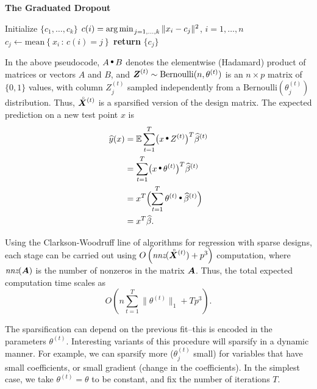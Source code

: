 \documentclass[12pt]{imsart}
\numberwithin{equation}{section}
\theoremstyle{plain}
\theoremstyle{remark}
\def\mbf#1{\mbox{\boldmath$#1$}}
\def\E{{\mathbb E}}
\def\argmin{\mathop{\text{\rm arg\,min}}}
\let\hat\widehat
\let\hat\widehat
\let\hat\widehat
\def\E{{\mathbb E}}
\def\argmin{\mathop{\text{arg\,min}\kern.2ex}}
\let\hat\widehat
\def\betas#1{\widehat\beta^{(#1)}}
\def\thetas#1{\theta^{(#1)}}
\def\Zs#1{\mbf{Z}^{(#1)}}
\def\Xs#1{\accentset{\;\circ}{\mbf{X}}^{(#1)}}
\def\hadamard{\mathop{\raise.5ex\hbox{$\scriptstyle\bullet$}}}
\begin{document}
\begin{frontmatter}
{\bf The Graduated Dropout}
\end{frontmatter}

\begin{center}
\begin{minipage}{.75\columnwidth}
\begin{algorithmic}[1]
   \State Initialize $\{c_1,\ldots, c_k\}$
      \State $c(i) = \argmin_{j=1,\ldots,k} \|x_i - c_j\|^2$, $i=1,\ldots, n$
      \State $c_j \gets \text{mean}\left\{x_i \,:\, c(i) = j\right\}$
   \EndWhile
   \State \textbf{return} $\{c_j\}$
\EndProcedure
\end{algorithmic}
\end{minipage}
\end{center}

In the above pseudocode, $A\hadamard B$ denotes the elementwise
(Hadamard) product of matrices or vectors $A$ and $B$, and $\Zs{t} \sim \text{Bernoulli}(n, \thetas{t})$
is an $n\times p$ matrix of $\{0,1\}$ values, with column $Z_j^{(t)}$ sampled
independently from a $\text{Bernoulli}(\thetas{t}_j)$ distribution.
Thus, $\Xs{t}$ is a sparsified version of the design matrix.
The expected prediction on a new test point $x$ is
\begin{align}
\hat y(x) & = \E \sum_{t=1}^T \bigl(x\hadamard Z^{(t)}\bigr)^T \betas{t} \\
& = \sum_{t=1}^T \bigl(x\hadamard \thetas{t}\bigl)^T \betas{t} \\
& =  x^T \Bigl(\sum_{t=1}^T \thetas{t}\hadamard \betas{t}\Bigr) \\
& = x^T \hat \beta.
\end{align}

Using the
Clarkson-Woodruff line of algorithms for regression with sparse designs, each stage can be carried out
using $O\left(\textit{nnz}(\Xs{t})+p^3\right)$ computation,
where $\textit{nnz}(\mbf{A})$ is the number of nonzeros in the matrix $\mbf{A}$.  Thus,
the total expected computation time scales as 
$$O\left(n\sum_{t=1}^T \|\thetas{t}\|_1 + Tp^3\right).$$

The sparsification can depend on the previous fit--this
is encoded in the parameters $\thetas{t}$.
Interesting variants of this procedure will sparsify in a dynamic
manner.  For example, we can sparsify more ($\thetas{t}_j$ small)
for variables that have small coefficients, or small gradient (change
in the coefficients).  
In the simplest case, we take $\thetas{t}=\theta$ to be constant, and
fix the number of iterations $T$.
\end{document}
